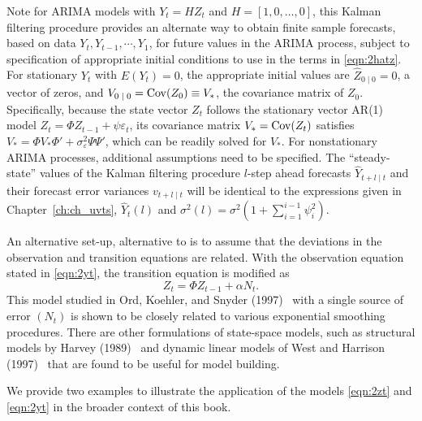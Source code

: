 Note for ARIMA models with $Y_t = HZ_t$ and $H = [1,0,\ldots,0]$, this Kalman filtering procedure provides an alternate way to obtain finite sample forecasts, based on data $Y_t,Y_{t-1}, \cdots, Y_1$, for future values in the ARIMA process, subject to specification of appropriate initial conditions to use in the terms in \eqref{eqn:2hatz}. For stationary $Y_t$ with $E(Y_t)= 0$, the appropriate initial values are $\hat{Z}_{0 \;|\;0} = 0$, a vector of zeros, and $V_{0 \;|\;0} = \operatorname{Cov}(Z_0) \equiv V_*$, the covariance matrix of $Z_0$. Specifically, because the state vector $Z_t$ follows the stationary vector AR(1) model $Z_t = \Phi Z_{t-1} + \psi \varepsilon_t$, its covariance matrix $V_*= \operatorname{Cov}(Z_t)$ satisfies $V_*= \Phi V_* \Phi' + \sigma_{\varepsilon}^2 \Psi \Psi'$, which can be readily solved for $V_*$. For nonstationary ARIMA processes, additional assumptions need to be specified. The ``steady-state'' values of the Kalman filtering procedure $l$-step ahead forecasts $\hat{Y}_{t+l\;|\;t}$ and their forecast error variances $v_{t+l\;|\;t}$ will be identical to the expressions given in Chapter~\ref{ch:ch_uvts}, $\hat{Y}_t(l)$ and $\sigma^2(l) = \sigma^2 (1 + \sum_{i=1}^{i-1}\psi_{i}^2 )$. 


An alternative set-up, alternative to is to assume that the deviations in the observation and transition equations are related. With the observation equation stated in \eqref{eqn:2yt}, the transition equation is modified as 
	\begin{equation} \label{eqn:223zt}
	Z_t = \Phi Z_{t-1} + \alpha N_t.
	\end{equation}
This model studied in Ord, Koehler, and Snyder (1997)~\cite{ord1997estimation} with a single source of error $(N_t)$ is shown to be closely related to various exponential smoothing procedures. There are other formulations of state-space models, such as structural models by Harvey (1989)~\cite{harvey1989kalman} and dynamic linear models of West and Harrison (1997)~\cite{west1997} that are found to be useful for model building.


We provide two examples to illustrate the application of the models \eqref{eqn:2zt} and \eqref{eqn:2yt} in the broader context of this book. 


